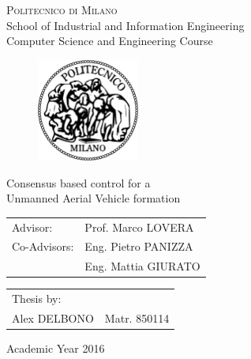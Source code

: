 \begin{titlepage}

\begin{center}
\Large{\textsc{Politecnico di Milano}}\\
\Large{School of Industrial and Information Engineering}\\
\large{Computer Science and Engineering Course}\\
\par
\end{center}

\vspace{0.2cm}

\begin{center}
\begin{figure}[h]
\centering{}
\includegraphics[width=0.3\textwidth]{title-page/logo-polimi}
\end{figure}
\par
\end{center}

\begin{center}
\LARGE{Consensus based control for a \\Unmanned Aerial Vehicle formation}
\vspace{1.0cm}
\par
\end{center}

\begin{flushleft}
\begin{tabular}{ll}
Advisor:  & Prof. Marco LOVERA\tabularnewline
Co-Advisors:  & Eng. Pietro PANIZZA\tabularnewline
              & Eng. Mattia GIURATO\tabularnewline
\end{tabular}\vspace{0.3cm}
\par
\end{flushleft}

\begin{flushright}
\begin{tabular}{ll}
Thesis by: & \tabularnewline
Alex DELBONO & Matr. 850114\tabularnewline
\end{tabular}\vspace{1cm}
\par
\end{flushright}

\begin{center}
{\large{}Academic Year 2016}
\par
\end{center}{\large \par}

\end{titlepage}
